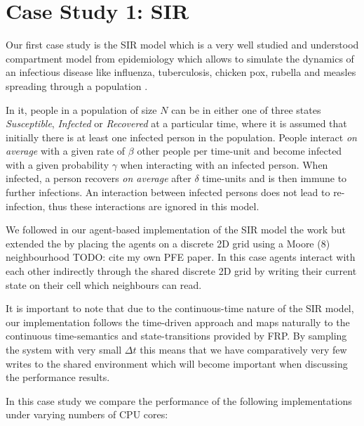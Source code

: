 \section{Case Study 1: SIR} 
Our first case study is the SIR model which is a very well studied and understood compartment model from epidemiology \cite{kermack_contribution_1927} which allows to simulate the dynamics of an infectious disease like influenza, tuberculosis, chicken pox, rubella and measles spreading through a population \cite{enns_its_2010}.

In it, people in a population of size $N$ can be in either one of three states \textit{Susceptible}, \textit{Infected} or \textit{Recovered} at a particular time, where it is assumed that initially there is at least one infected person in the population. People interact \textit{on average} with a given rate of $\beta$ other people per time-unit and become infected with a given probability $\gamma$ when interacting with an infected person. When infected, a person recovers \textit{on average} after $\delta$ time-units and is then immune to further infections. An interaction between infected persons does not lead to re-infection, thus these interactions are ignored in this model. 

We followed in our agent-based implementation of the SIR model the work \cite{macal_agent-based_2010} but extended the  by placing the agents on a discrete 2D grid using a Moore (8) neighbourhood TODO: cite my own PFE paper. In this case agents interact with each other indirectly through the shared discrete 2D grid by writing their current state on their cell which neighbours can read.

It is important to note that due to the continuous-time nature of the SIR model, our implementation follows the time-driven \cite{meyer_event-driven_2014} approach and maps naturally to the continuous time-semantics and state-transitions provided by FRP. By sampling the system with very small $\Delta t$ this means that we have comparatively very few writes to the shared environment which will become important when discussing the performance results.

In this case study we compare the performance of the following implementations under varying numbers of CPU cores:

